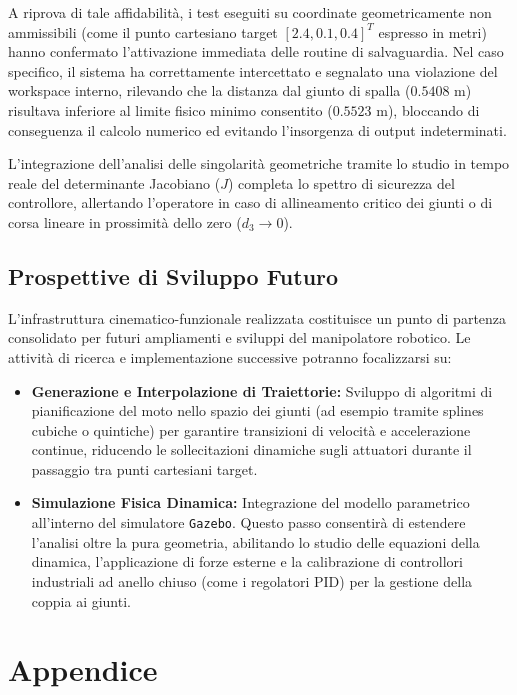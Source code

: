 \documentclass[11pt, a4paper]{report}
\begin{document}
A riprova di tale affidabilità, i test eseguiti su coordinate geometricamente non ammissibili (come il punto cartesiano target \([2.4, 0.1, 0.4]^T\) espresso in metri) hanno confermato l'attivazione immediata delle routine di salvaguardia. Nel caso specifico, il sistema ha correttamente intercettato e segnalato una violazione del workspace interno, rilevando che la distanza dal giunto di spalla (\(0.5408\) m) risultava inferiore al limite fisico minimo consentito (\(0.5523\) m), bloccando di conseguenza il calcolo numerico ed evitando l'insorgenza di output indeterminati.

L'integrazione dell'analisi delle singolarità geometriche tramite lo studio in tempo reale del determinante Jacobiano (\(J\)) completa lo spettro di sicurezza del controllore, allertando l'operatore in caso di allineamento critico dei giunti o di corsa lineare in prossimità dello zero (\(d_3 \to 0\)).
\newpage
\section{Prospettive di Sviluppo Futuro}
L'infrastruttura cinematico-funzionale realizzata costituisce un punto di partenza consolidato per futuri ampliamenti e sviluppi del manipolatore robotico. Le attività di ricerca e implementazione successive potranno focalizzarsi su:
\begin{itemize}
    \item \textbf{Generazione e Interpolazione di Traiettorie:} Sviluppo di algoritmi di pianificazione del moto nello spazio dei giunti (ad esempio tramite splines cubiche o quintiche) per garantire transizioni di velocità e accelerazione continue, riducendo le sollecitazioni dinamiche sugli attuatori durante il passaggio tra punti cartesiani target.

    \item \textbf{Simulazione Fisica Dinamica:} Integrazione del modello parametrico all'interno del simulatore \texttt{Gazebo}. Questo passo consentirà di estendere l'analisi oltre la pura geometria, abilitando lo studio delle equazioni della dinamica, l'applicazione di forze esterne e la calibrazione di controllori industriali ad anello chiuso (come i regolatori PID) per la gestione della coppia ai giunti.
\end{itemize}

\appendix

\chapter{Appendice}
\end{document}
